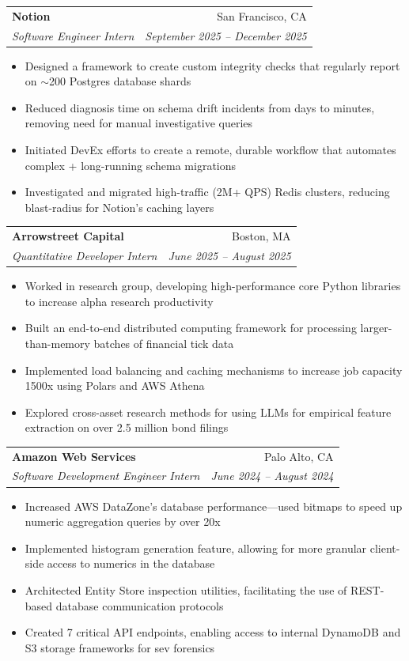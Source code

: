 \documentclass[letterpaper,11pt]{article}
\makeatletter
\newcommand{\resumeItem}[1]{
  \item\small{
    {#1 \vspace{-2pt}}
  }
}
\newcommand{\resumeSubheading}[4]{
  \vspace{-2pt}\item
    \begin{tabular*}{0.97\textwidth}[t]{l@{\extracolsep{\fill}}r}
      \textbf{#1} & #2 \\
      \textit{\small#3} & \textit{\small #4} \\
    \end{tabular*}\vspace{-7pt}
}
\newcommand{\resumeItemListStart}{\begin{itemize}}
\newcommand{\resumeItemListEnd}{\end{itemize}\vspace{-5pt}}
\makeatother
\begin{document}
    \resumeSubheading
      {Notion}{San Francisco, CA}
      {Software Engineer Intern}{September 2025 -- December 2025}
      \resumeItemListStart
        \resumeItem{Designed a framework to create custom integrity checks that regularly report on $\sim$200 Postgres database shards}
        \resumeItem{Reduced diagnosis time on schema drift incidents from days to minutes, removing need for manual investigative queries}
        \resumeItem{Initiated DevEx efforts to create a remote, durable workflow that automates complex + long-running schema migrations}
        \resumeItem{Investigated and migrated high-traffic (2M+ QPS) Redis clusters, reducing blast-radius for Notion's caching layers}
      \resumeItemListEnd

    \resumeSubheading
      {Arrowstreet Capital}{Boston, MA}
      {Quantitative Developer Intern}{June 2025 -- August 2025}
      \resumeItemListStart
        \resumeItem{Worked in research group, developing high-performance core Python libraries to increase alpha research productivity}
        \resumeItem{Built an end-to-end distributed computing framework for processing larger-than-memory batches of financial tick data}
        \resumeItem{Implemented load balancing and caching mechanisms to increase job capacity 1500x using Polars and AWS Athena}
        \resumeItem{Explored cross-asset research methods for using LLMs for empirical feature extraction on over 2.5 million bond filings}
      \resumeItemListEnd

    \resumeSubheading
      {Amazon Web Services}{Palo Alto, CA}
      {Software Development Engineer Intern}{June 2024 -- August 2024}
      \resumeItemListStart
        \resumeItem{Increased AWS DataZone's database performance—used bitmaps to speed up numeric aggregation queries by over 20x}
        \resumeItem{Implemented histogram generation feature, allowing for more granular client-side access to numerics in the database}
        \resumeItem{Architected Entity Store inspection utilities, facilitating the use of REST-based database communication protocols}
        \resumeItem{Created 7 critical API endpoints, enabling access to internal DynamoDB and S3 storage frameworks for sev forensics}
      \resumeItemListEnd

\end{document}
